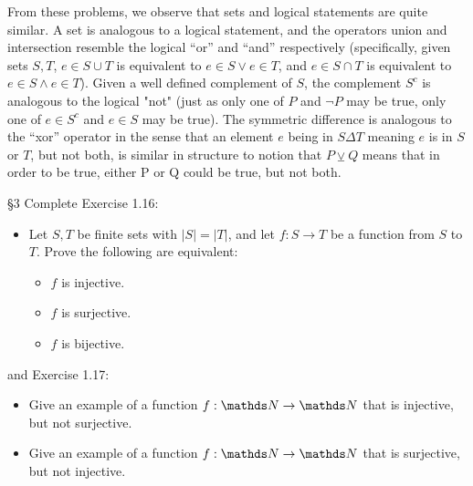 \documentclass{homework}
\begin{document}
\begin{solution}
From these problems, we observe that sets and logical statements are quite similar. A set is
analogous to a logical statement, and the operators union and intersection resemble the logical
``or'' and ``and'' respectively (specifically, given sets $S,T$, $e\in S\cup T$ is equivalent to
$e\in S\lor e\in T$, and $e\in S\cap T$ is equivalent to $e\in S\land e\in T$). 
Given a well defined complement of $S$, the complement $S^{c}$ is analogous
to the logical "not" (just as only one of $P$ and  $\neg P$ may be true, only one of  $e\in S^{c}$
and $e\in S$ may be true). The symmetric difference is analogous to the ``xor'' operator in the sense
that an element $e$ being in $S\Delta T$ meaning $e$ is in $S$ or $T$, but not both, is similar in
structure to notion that $P\veebar Q$ means that in order to be true, either P or Q could be true,
but not both.
\end{solution}


\begin{problem}{\S 3}
  Complete Exercise 1.16:
  \begin{itemize}
    \item Let $S, T$ be finite sets with $\left| S \right| =\left| T \right| $, and let $f: S \to
      T$ be a function from $S$ to $T$. Prove the following are equivalent:
      \begin{itemize}
        \item $f$ is injective.
        \item $f$ is surjective.
        \item $f$ is bijective.
      \end{itemize}
  \end{itemize}
  and Exercise 1.17:
  \begin{itemize}
    \item Give an example of a function $f: \N \to \N$ that is injective, but not surjective.
    \item Give an example of a function $f: \N \to \N$ that is surjective, but not injective.
  \end{itemize}
\end{problem}
\end{document}
